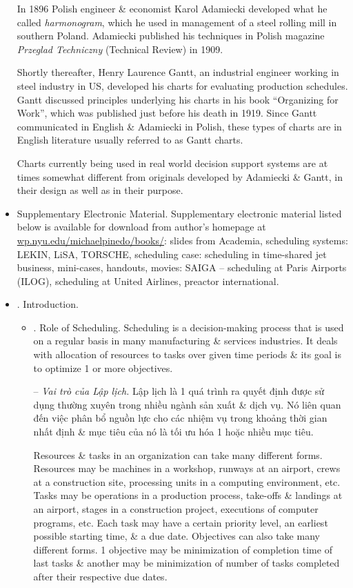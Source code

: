 \documentclass{article}
\begin{document}
\begin{itemize}
    In 1896 Polish engineer \& economist {\sc Karol Adamiecki} developed what he called {\it harmonogram}, which he used in management of a steel rolling mill in southern Poland. {\sc Adamiecki} published his techniques in Polish magazine {\it Przeglad Techniczny} (Technical Review) in 1909.

    Shortly thereafter, {\sc Henry Laurence Gantt}, an industrial engineer working in steel industry in US, developed his charts for evaluating production schedules. {\sc Gantt} discussed principles underlying his charts in his book ``Organizing for Work'', which was published just before his death in 1919. Since {\sc Gantt} communicated in English \& {\sc Adamiecki} in Polish, these types of charts are in English literature usually referred to as Gantt charts.

    Charts currently being used in real world decision support systems are at times somewhat different from originals developed by {\sc Adamiecki \& Gantt}, in their design as well as in their purpose.
    \item {\sf Supplementary Electronic Material.} Supplementary electronic material listed below is available for download from author's homepage at \url{wp.nyu.edu/michaelpinedo/books/}: slides from Academia, scheduling systems: LEKIN, LiSA, TORSCHE, scheduling case: scheduling in time-shared jet business, mini-cases, handouts, movies: SAIGA -- scheduling at Paris Airports (ILOG), scheduling at United Airlines, preactor international.
    \item {. Introduction.}
    \begin{itemize}
        \item {. Role of Scheduling.} Scheduling is a decision-making process that is used on a regular basis in many manufacturing \& services industries. It deals with allocation of resources to tasks over given time periods \& its goal is to optimize 1 or more objectives.

        -- {\it Vai trò của Lập lịch.} Lập lịch là 1 quá trình ra quyết định được sử dụng thường xuyên trong nhiều ngành sản xuất \& dịch vụ. Nó liên quan đến việc phân bổ nguồn lực cho các nhiệm vụ trong khoảng thời gian nhất định \& mục tiêu của nó là tối ưu hóa 1 hoặc nhiều mục tiêu.

        Resources \& tasks in an organization can take many different forms. Resources may be machines in a workshop, runways at an airport, crews at a construction site, processing units in a computing environment, etc. Tasks may be operations in a production process, take-offs \& landings at an airport, stages in a construction project, executions of computer programs, etc. Each task may have a certain priority level, an earliest possible starting time, \& a due date. Objectives can also take many different forms. 1 objective may be minimization of completion time of last tasks \& another may be minimization of number of tasks completed after their respective due dates.


\end{itemize}
\end{itemize}
\end{document}
